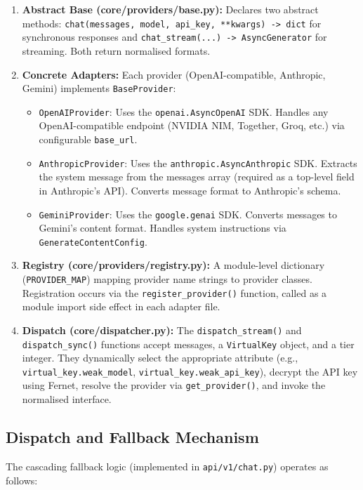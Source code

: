 \documentclass[12pt,a4paper]{report}
\begin{document}
\begin{enumerate}[nosep]
    \item \textbf{Abstract Base (core/providers/base.py):} Declares two abstract methods: \texttt{chat(messages, model, api\_key, **kwargs) -> dict} for synchronous responses and \texttt{chat\_stream(...) -> AsyncGenerator} for streaming. Both return normalised formats.
    \item \textbf{Concrete Adapters:} Each provider (OpenAI-compatible, Anthropic, Gemini) implements \texttt{BaseProvider}:
    \begin{itemize}[nosep]
        \item \texttt{OpenAIProvider}: Uses the \texttt{openai.AsyncOpenAI} SDK. Handles any OpenAI-compatible endpoint (NVIDIA NIM, Together, Groq, etc.) via configurable \texttt{base\_url}.
        \item \texttt{AnthropicProvider}: Uses the \texttt{anthropic.AsyncAnthropic} SDK. Extracts the system message from the messages array (required as a top-level field in Anthropic's API). Converts message format to Anthropic's schema.
        \item \texttt{GeminiProvider}: Uses the \texttt{google.genai} SDK. Converts messages to Gemini's content format. Handles system instructions via \texttt{GenerateContentConfig}.
    \end{itemize}
    \item \textbf{Registry (core/providers/registry.py):} A module-level dictionary (\texttt{PROVIDER\_MAP}) mapping provider name strings to provider classes. Registration occurs via the \texttt{register\_provider()} function, called as a module import side effect in each adapter file.
    \item \textbf{Dispatch (core/dispatcher.py):} The \texttt{dispatch\_stream()} and \texttt{dispatch\_sync()} functions accept messages, a \texttt{VirtualKey} object, and a tier integer. They dynamically select the appropriate attribute (e.g., \texttt{virtual\_key.weak\_model}, \texttt{virtual\_key.weak\_api\_key}), decrypt the API key using Fernet, resolve the provider via \texttt{get\_provider()}, and invoke the normalised interface.
\end{enumerate}

\subsection{Dispatch and Fallback Mechanism}

The cascading fallback logic (implemented in \texttt{api/v1/chat.py}) operates as follows:
\end{document}
